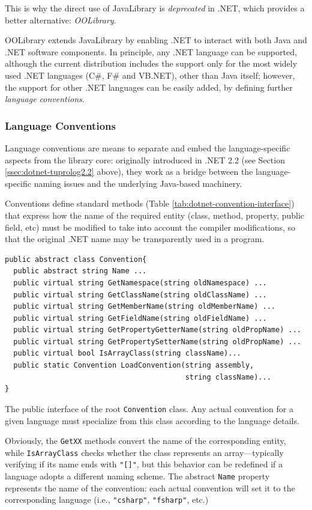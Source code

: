 This is why the direct use of JavaLibrary is \textit{deprecated} in \tuprolog{}.NET, which provides a better alternative: \textit{OOLibrary}.

OOLibrary extends JavaLibrary by enabling \tuprolog{}.NET to interact with both Java and .NET software components. In principle, any .NET language can be supported, although the current distribution includes the support only for the most widely used .NET languages (C\#, F\# and VB.NET), other than Java itself; however, the support for other .NET languages can be easily added, by defining further \textit{language conventions}.

\subsubsection{Language Conventions}

Language conventions are \tuprolog{} means to separate and embed the language-specific aspects from the library core: originally introduced in \tuprolog{}.NET 2.2 (see Section \ref{ssec:dotnet-tuprolog2.2} above), they work as a bridge between the language-specific naming issues and the underlying Java-based machinery.

Conventions define standard methods (Table \ref{tab:dotnet-convention-interface}) that express how the name of the required entity (class, method, property, public field, etc) must be modified to take into account the compiler modifications, so that the original .NET name may be transparently used in a \tuprolog{} program.
%
\begin{table}
{\small
\begin{verbatim}
public abstract class Convention{
  public abstract string Name ...
  public virtual string GetNamespace(string oldNamespace) ...
  public virtual string GetClassName(string oldClassName) ...
  public virtual string GetMemberName(string oldMemberName) ...
  public virtual string GetFieldName(string oldFieldName) ...
  public virtual string GetPropertyGetterName(string oldPropName) ...
  public virtual string GetPropertySetterName(string oldPropName) ...
  public virtual bool IsArrayClass(string className)...
  public static Convention LoadConvention(string assembly,
                                          string className)...
}
\end{verbatim}
}
\caption{The public interface of the root \texttt{Convention} class. Any actual convention for a given language must specialize from this class according to the language details.}
\label{tab:dotnet-convention-interface}
\end{table}
%
Obviously, the \texttt{GetXX} methods convert the name of the corresponding entity, while \texttt{IsArrayClass} checks whether the class represents an array---typically verifying if its name ends with \texttt{"[]"}, but this behavior can be redefined if a language adopts a different naming scheme.
The abstract \texttt{Name} property represents the name of the convention: each actual convention will set it to the corresponding language (i.e., \texttt{"csharp"}, \texttt{"fsharp"}, etc.)

